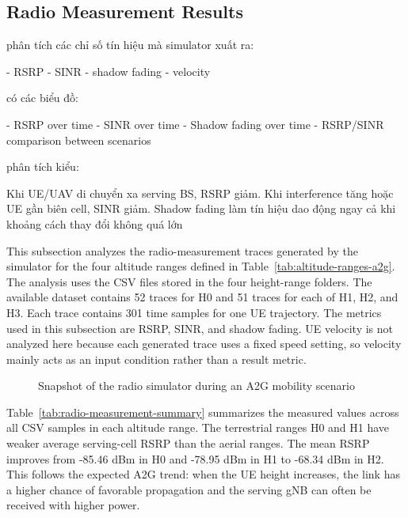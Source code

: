 \subsection{Radio Measurement Results}
phân tích các chỉ số tín hiệu mà simulator xuất ra:

- RSRP
- SINR
- shadow fading
- velocity

có các biểu đồ:

- RSRP over time
- SINR over time
- Shadow fading over time
- RSRP/SINR comparison between scenarios

phân tích kiểu:

Khi UE/UAV di chuyển xa serving BS, RSRP giảm. Khi interference tăng hoặc UE gần biên cell, SINR giảm. Shadow fading làm tín hiệu dao động ngay cả khi khoảng cách thay đổi không quá lớn

This subsection analyzes the radio-measurement traces generated by the simulator for the four altitude ranges defined in Table~\ref{tab:altitude-ranges-a2g}. The analysis uses the CSV files stored in the four height-range folders. The available dataset contains 52 traces for H0 and 51 traces for each of H1, H2, and H3. Each trace contains 301 time samples for one UE trajectory. The metrics used in this subsection are RSRP, SINR, and shadow fading. UE velocity is not analyzed here because each generated trace uses a fixed speed setting, so velocity mainly acts as an input condition rather than a result metric.

\begin{figure}[!htbp]
\centering
{}
\caption{Snapshot of the radio simulator during an A2G mobility scenario}
\label{fig:radio-simulator-screenshot}
\end{figure}

Table~\ref{tab:radio-measurement-summary} summarizes the measured values across all CSV samples in each altitude range. The terrestrial ranges H0 and H1 have weaker average serving-cell RSRP than the aerial ranges. The mean RSRP improves from -85.46 dBm in H0 and -78.95 dBm in H1 to -68.34 dBm in H2. This follows the expected A2G trend: when the UE height increases, the link has a higher chance of favorable propagation and the serving gNB can often be received with higher power.

